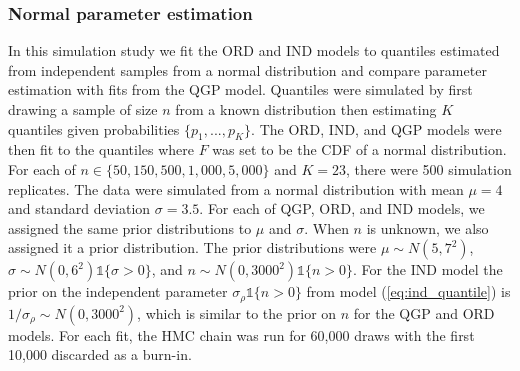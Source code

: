 \documentclass[preprint,12pt,authoryear]{elsarticle}
\newcommand{\1}[1]{\mathds{1}\left[#1\right]}
\begin{document}
\subsubsection{Normal parameter estimation}
In this simulation study we fit the ORD and IND models to quantiles estimated 
from independent samples from a normal distribution and compare parameter 
estimation with fits from the QGP model. Quantiles were simulated by first 
drawing a sample of size $n$ from a known distribution then estimating $K$ 
quantiles given probabilities $\{p_1, ..., p_K\}$. The ORD, IND, and QGP models 
were then fit to the quantiles where $F$ was set to be the CDF of a normal 
distribution. For each of 
$n \in \{50, 150, 500, 1{,}000, 5{,}000\}$ and 
$K = 23$, there 
were 500 simulation replicates. The data were simulated from a normal 
distribution with mean $\mu = 4$ and standard deviation $\sigma = 3.5$.
For each of QGP, ORD, and IND models, we assigned the same prior distributions 
to $\mu$ and $\sigma$. When $n$ is unknown, we also assigned it a prior 
distribution. The prior distributions were $\mu \sim N(5,7^2)$, 
$\sigma \sim N(0, 6^2) \mathds{1} \{\sigma > 0\}$, and
$n \sim N(0,3000^2)\mathds{1}\{n > 0\}$.
For the IND model the prior on the independent parameter 
$\sigma_{\rho}\mathds{1}\{n > 0\}$ from model (\ref{eq:ind_quantile}) is 
$1/\sigma_{\rho} \sim N(0, 3000^2)$, which is similar to the prior on $n$ for 
the QGP and ORD models. For each fit, the HMC chain was run for 60,000 draws 
with the first 10,000 discarded as a burn-in.
\end{document}
